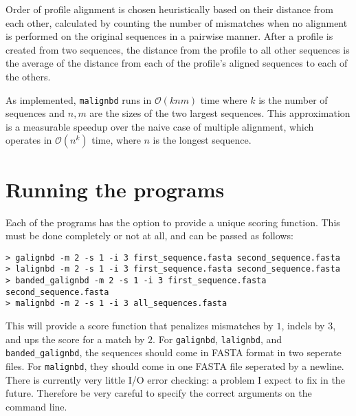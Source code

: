 \documentclass[11pt]{article}
\newcommand{\prog}[1]{\texttt{#1}}
\begin{document}
\begin{enumerate}
Order of profile alignment is chosen heuristically based on their distance
from each other, calculated by counting the number of mismatches when no
alignment is performed on the original sequences in a pairwise manner. After
a profile is created from two sequences, the distance from the profile to
all other sequences is the average of the distance from each of the profile's
aligned sequences to each of the others.

As implemented, \prog{malignbd} runs in $\mathcal{O}(knm)$ time where $k$ is
the number of sequences and $n,m$ are the sizes of the two largest sequences.
This approximation is a measurable speedup over the naive case of multiple
alignment, which operates in  $\mathcal{O}(n^k)$ time, where $n$ is the 
longest sequence.

\end{enumerate}

\section{Running the programs}

Each of the programs has the option to provide a unique scoring function.
This must be done completely or not at all, and can be passed as follows:

\begin{verbatim}
> galignbd -m 2 -s 1 -i 3 first_sequence.fasta second_sequence.fasta
> lalignbd -m 2 -s 1 -i 3 first_sequence.fasta second_sequence.fasta
> banded_galignbd -m 2 -s 1 -i 3 first_sequence.fasta second_sequence.fasta
> malignbd -m 2 -s 1 -i 3 all_sequences.fasta
\end{verbatim}

This will provide a score function that penalizes mismatches by $1$, indels
by $3$, and ups the score for a match by $2$. For \prog{galignbd},
\prog{lalignbd}, and 
\prog{banded\_galignbd}, the sequences should come in FASTA format in two
seperate files. For \prog{malignbd}, they should come in one FASTA file
seperated by a newline. There is currently very little I/O error checking:
a problem I expect to fix in the future. Therefore be very careful to specify
the correct arguments on the command line.
\end{document}
